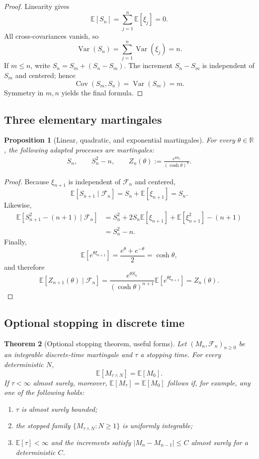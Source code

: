 \documentclass[10pt,a4paper]{article}
\numberwithin{equation}{section}
\theoremstyle{blueplain}
\newtheorem{theorem}{Theorem}[section]
\newtheorem{proposition}[theorem]{Proposition}
\theoremstyle{definition}
\newcommand{\E}{\mathbb E}
\newcommand{\R}{\mathbb R}
\newcommand{\F}{\mathcal F}
\newcommand{\Var}{\operatorname{Var}}
\newcommand{\Cov}{\operatorname{Cov}}
\begin{document}
\begin{proof}
Linearity gives
\[
  \E[S_n]=\sum_{j=1}^n\E[\xi_j]=0.
\]
All cross-covariances vanish, so
\[
  \Var(S_n)=\sum_{j=1}^n\Var(\xi_j)=n.
\]
If \(m\le n\), write \(S_n=S_m+(S_n-S_m)\).  The increment
\(S_n-S_m\) is independent of \(S_m\) and centered; hence
\[
  \Cov(S_m,S_n)=\Var(S_m)=m.
\]
Symmetry in \(m,n\) yields the final formula.
\end{proof}

\subsection{Three elementary martingales}

\begin{proposition}[Linear, quadratic, and exponential martingales]
For every \(\theta\in\R\), the following adapted processes are martingales:
\begin{align}
  S_n,
  \qquad
  S_n^2-n,
  \qquad
  Z_n(\theta):=\frac{e^{\theta S_n}}{(\cosh\theta)^n}.
  \label{eq:three-srw-martingales}
\end{align}
\end{proposition}

\begin{proof}
Because \(\xi_{n+1}\) is independent of \(\F_n\) and centered,
\[
  \E[S_{n+1}\mid\F_n]
  =S_n+\E[\xi_{n+1}]=S_n.
\]
Likewise,
\begin{align*}
  \E[S_{n+1}^2-(n+1)\mid\F_n]
  &=S_n^2+2S_n\E[\xi_{n+1}]+\E[\xi_{n+1}^2]-(n+1)\\
  &=S_n^2-n.
\end{align*}
Finally,
\[
  \E[e^{\theta\xi_{n+1}}]
  =\frac{e^\theta+e^{-\theta}}2=\cosh\theta,
\]
and therefore
\[
  \E[Z_{n+1}(\theta)\mid\F_n]
  =\frac{e^{\theta S_n}}{(\cosh\theta)^{n+1}}
   \E[e^{\theta\xi_{n+1}}]
  =Z_n(\theta).
\]
\end{proof}

\subsection{Optional stopping in discrete time}

\begin{theorem}[Optional stopping theorem, useful forms]
\label{thm:discrete-ost}
Let \((M_n,\F_n)_{n\ge0}\) be an integrable discrete-time martingale and
\(\tau\) a stopping time.  For every deterministic \(N\),
\begin{equation}
  \E[M_{\tau\wedge N}]=\E[M_0].
  \label{eq:bounded-ost}
\end{equation}
If \(\tau<\infty\) almost surely, moreover,
\(\E[M_\tau]=\E[M_0]\) follows if, for example, any one of the following
holds:
\begin{enumerate}[label=(\roman*)]
  \item \(\tau\) is almost surely bounded;
  \item the stopped family \(\{M_{\tau\wedge N}:N\ge1\}\) is uniformly
  integrable;
  \item \(\E[\tau]<\infty\) and the increments satisfy
  \(|M_n-M_{n-1}|\le C\) almost surely for a deterministic \(C\).
\end{enumerate}
\end{theorem}
\end{document}
